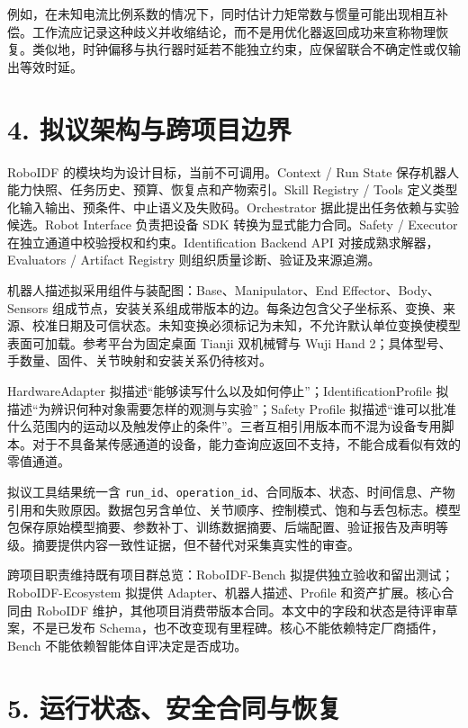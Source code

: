 \documentclass[
  chinese,
  11pt,
  a4paper,
  fontset=fandol]{ctexart}
\begin{document}
例如，在未知电流比例系数的情况下，同时估计力矩常数与惯量可能出现相互补偿。工作流应记录这种歧义并收缩结论，而不是用优化器返回成功来宣称物理恢复。类似地，时钟偏移与执行器时延若不能独立约束，应保留联合不确定性或仅输出等效时延。

\section{4.
拟议架构与跨项目边界}\label{ux62dfux8baeux67b6ux6784ux4e0eux8de8ux9879ux76eeux8fb9ux754c}

RoboIDF 的模块均为设计目标，当前不可调用。Context / Run State
保存机器人能力快照、任务历史、预算、恢复点和产物索引。Skill Registry /
Tools 定义类型化输入输出、预条件、中止语义及失败码。Orchestrator
据此提出任务依赖与实验候选。Robot Interface 负责把设备 SDK
转换为显式能力合同。Safety / Executor
在独立通道中校验授权和约束。Identification Backend API
对接成熟求解器，Evaluators / Artifact Registry
则组织质量诊断、验证及来源追溯。

机器人描述拟采用组件与装配图：Base、Manipulator、End
Effector、Body、Sensors
组成节点，安装关系组成带版本的边。每条边包含父子坐标系、变换、来源、校准日期及可信状态。未知变换必须标记为未知，不允许默认单位变换使模型表面可加载。参考平台为固定桌面
Tianji 双机械臂与 Wuji Hand
2；具体型号、手数量、固件、关节映射和安装关系仍待核对。

HardwareAdapter
拟描述``能够读写什么以及如何停止''；IdentificationProfile
拟描述``为辨识何种对象需要怎样的观测与实验''；Safety Profile
拟描述``谁可以批准什么范围内的运动以及触发停止的条件''。三者互相引用版本而不混为设备专用脚本。对于不具备某传感通道的设备，能力查询应返回不支持，不能合成看似有效的零值通道。

拟议工具结果统一含
\texttt{run\_id}、\texttt{operation\_id}、合同版本、状态、时间信息、产物引用和失败原因。数据包另含单位、关节顺序、控制模式、饱和与丢包标志。模型包保存原始模型摘要、参数补丁、训练数据摘要、后端配置、验证报告及声明等级。摘要提供内容一致性证据，但不替代对采集真实性的审查。

跨项目职责维持既有项目群总览：RoboIDF-Bench
拟提供独立验收和留出测试；RoboIDF-Ecosystem 拟提供
Adapter、机器人描述、Profile 和资产扩展。核心合同由 RoboIDF
维护，其他项目消费带版本合同。本文中的字段和状态是待评审草案，不是已发布
Schema，也不改变现有里程碑。核心不能依赖特定厂商插件，Bench
不能依赖智能体自评决定是否成功。

\section{5.
运行状态、安全合同与恢复}\label{ux8fd0ux884cux72b6ux6001ux5b89ux5168ux5408ux540cux4e0eux6062ux590d}
\end{document}
